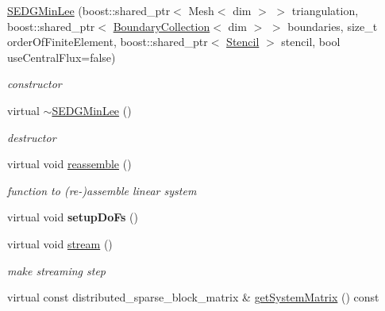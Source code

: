 \begin{DoxyCompactItemize}
\item 
\hyperlink{classnatrium_1_1SEDGMinLee_a1d570e9833c6b0df01a0cd7cf3b8c905}{SEDGMinLee} (boost::shared\_\-ptr$<$ Mesh$<$ dim $>$ $>$ triangulation, boost::shared\_\-ptr$<$ \hyperlink{classnatrium_1_1BoundaryCollection}{BoundaryCollection}$<$ dim $>$ $>$ boundaries, size\_\-t orderOfFiniteElement, boost::shared\_\-ptr$<$ \hyperlink{classnatrium_1_1Stencil}{Stencil} $>$ stencil, bool useCentralFlux=false)
\begin{DoxyCompactList}\small\item\em constructor \item\end{DoxyCompactList}\item 
\hypertarget{classnatrium_1_1SEDGMinLee_a6c55a31bc4cb0e314876af7251ad8ce3}{
virtual \hyperlink{classnatrium_1_1SEDGMinLee_a6c55a31bc4cb0e314876af7251ad8ce3}{$\sim$SEDGMinLee} ()}
\label{classnatrium_1_1SEDGMinLee_a6c55a31bc4cb0e314876af7251ad8ce3}

\begin{DoxyCompactList}\small\item\em destructor \item\end{DoxyCompactList}\item 
\hypertarget{classnatrium_1_1SEDGMinLee_afc9430efe8aefc7bbe580db2302b2392}{
virtual void \hyperlink{classnatrium_1_1SEDGMinLee_afc9430efe8aefc7bbe580db2302b2392}{reassemble} ()}
\label{classnatrium_1_1SEDGMinLee_afc9430efe8aefc7bbe580db2302b2392}

\begin{DoxyCompactList}\small\item\em function to (re-\/)assemble linear system \item\end{DoxyCompactList}\item 
\hypertarget{classnatrium_1_1SEDGMinLee_a61d0a648a6a46a4fb7445c67e010f14e}{
virtual void {\bfseries setupDoFs} ()}
\label{classnatrium_1_1SEDGMinLee_a61d0a648a6a46a4fb7445c67e010f14e}

\item 
\hypertarget{classnatrium_1_1SEDGMinLee_aba8ec4263463d79479a3bbbad2f65844}{
virtual void \hyperlink{classnatrium_1_1SEDGMinLee_aba8ec4263463d79479a3bbbad2f65844}{stream} ()}
\label{classnatrium_1_1SEDGMinLee_aba8ec4263463d79479a3bbbad2f65844}

\begin{DoxyCompactList}\small\item\em make streaming step \item\end{DoxyCompactList}\item 
\hypertarget{classnatrium_1_1SEDGMinLee_adcf3f6321cbf27f6c540a6c5f21c7cb0}{
virtual const distributed\_\-sparse\_\-block\_\-matrix \& \hyperlink{classnatrium_1_1SEDGMinLee_adcf3f6321cbf27f6c540a6c5f21c7cb0}{getSystemMatrix} () const }
\label{classnatrium_1_1SEDGMinLee_adcf3f6321cbf27f6c540a6c5f21c7cb0}


\end{DoxyCompactItemize}
